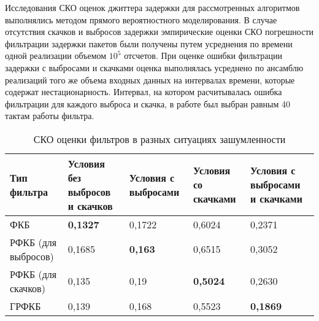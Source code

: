

Исследования СКО оценок джиттера задержки для рассмотренных алгоритмов выполнялись методом прямого вероятностного моделирования.
В случае отсутствия скачков и выбросов задержки эмпирические оценки СКО погрешности фильтрации задержки пакетов были получены путем усреднения по времени одной реализации объемом $10^5$ отсчетов.
При оценке ошибки фильтрации задержки с выбросами и скачками оценка выполнялась усреднено по ансамблю реализаций того же объема входных данных на интервалах времени, которые содержат нестационарность.
Интервал, на котором расчитывалась ошибка фильтрации для каждого выброса и скачка, в работе был выбран равным 40 тактам работы фильтра.

\begin{table} [!h]
  \centering
  \parbox{15cm}{\caption{СКО оценки фильтров в разных ситуациях зашумленности}\label{fkDiffSit}}
\begin{tabular}{|p{3cm}|p{3cm}|p{3cm}|p{3cm}|p{3cm}|}
    \hline
    Тип фильтра        & Условия без выбросов и скачков & Условия с выбросами & Условия со скачками  & Условия с выбросами и скачками \\ \hline
    ФКБ                 & \textbf{0,1327}                 & 0,1722                   & 0,6024                 & 0,2371                           \\ \hline
    РФКБ (для выбросов) & 0,1685                          &  \textbf{0,163}       & 0,6515                 & 0,3052                           \\ \hline
    РФКБ (для скачков)   & 0,135                           & 0,19               & \textbf{0,5024}                & 0,2630                             \\ \hline
    ГРФКБ               & 0,139                          & 0,168               &   0,5523            & \textbf{0,1869}                           \\ \hline
    \end{tabular}
\end{table}








